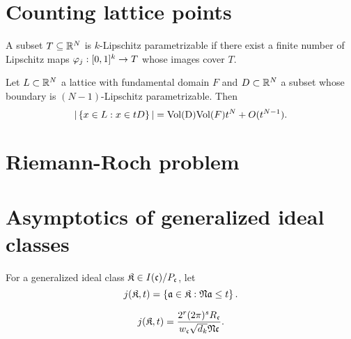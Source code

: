 \section{Counting lattice points}
\begin{df}
A subset $T\subseteq \mathbb{R}^N$ is $k$-Lipschitz parametrizable if there exist a finite number of Lipschitz maps $\varphi_j:[0,1]^k\to T$ whose images cover $T$.
\end{df}
\begin{thm}
Let $L\subset \mathbb{R}^N$ a lattice with fundamental domain $F$ and $D\subset\mathbb{R}^N$ a subset whose boundary is $(N-1)$-Lipschitz parametrizable. Then 
\[
|\left\{{x\in L}:{x\in tD}\right\}|=\text{\text{Vol}(D)}{\text{Vol}(F)}t^N+O(t^{N-1}).
\]
\end{thm}
\section{Riemann-Roch problem}
\section{Asymptotics of generalized ideal classes}
\begin{df}
For a generalized ideal class $\mathfrak K\in I(\mathfrak{c})/P_{\mathfrak{c}}$, let
\[
j(\mathfrak K,t)=\left\{{\mathfrak{a}\in \mathfrak K}:{\mathfrak{N} \mathfrak{a}\le t}\right\}.
\]
\end{df}
\begin{thm}
\[
j(\mathfrak K,t)=\frac{2^r(2\pi)^s R_{\mathfrak{c}}}{w_{\mathfrak{c}} \sqrt{d_k}\mathfrak{N} \mathfrak{c}}.
\]
\end{thm}